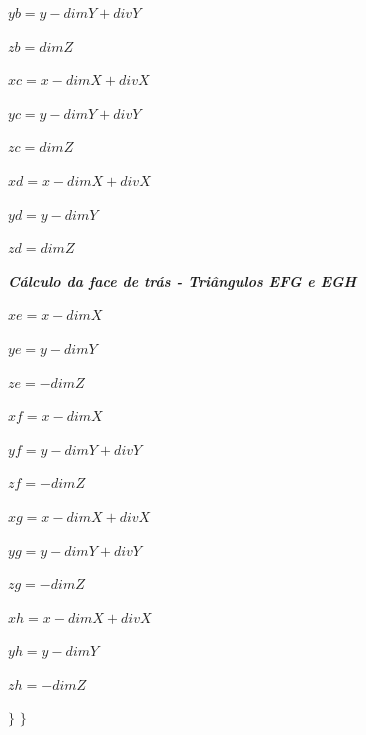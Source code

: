 \documentclass[12pt]{article}
\begin{document}
\par$yb = y - dimY + divY$ \newline
\par$zb = dimZ$ \newline\newline
\par$xc = x - dimX + divX$ \newline
\par$yc = y - dimY + divY$ \newline
\par$zc = dimZ$ \newline\newline
\par$xd = x - dimX + divX$ \newline
\par$yd = y - dimY$ \newline
\par$zd = dimZ$ \newline\newline
\par\textit{\textbf{Cálculo da face de trás - Triângulos EFG e EGH}} \newline
\par$xe = x - dimX$ \newline
\par$ye = y-dimY$ \newline
\par$ze = -dimZ$ \newline\newline
\par$xf = x - dimX$ \newline
\par$yf = y - dimY + divY$ \newline
\par$zf = -dimZ$ \newline\newline
\par$xg = x - dimX + divX$ \newline
\par$yg = y - dimY + divY$ \newline
\par$zg = -dimZ$ \newline\newline
\par$xh = x - dimX + divX$ \newline
\par$yh = y - dimY$ \newline
\par$zh = -dimZ$ \newline\newline
\par $\}$ \newline
$\}$\newline\newline
\end{document}
